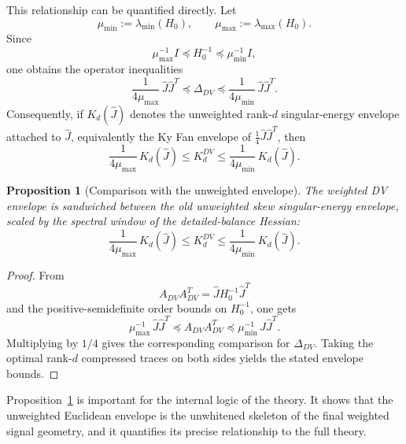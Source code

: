 \documentclass[11pt,a4paper]{article}
\numberwithin{equation}{section}
\theoremstyle{thmcompact}
\newtheorem{proposition}[theorem]{Proposition}
\theoremstyle{remark}
\begin{document}
This relationship can be quantified directly. Let
\begin{equation}
\mu_{\min}:=\lambda_{\min}(H_0),
\qquad
\mu_{\max}:=\lambda_{\max}(H_0).
\end{equation}
Since
\begin{equation}
\mu_{\max}^{-1}I\preceq H_0^{-1}\preceq \mu_{\min}^{-1}I,
\end{equation}
one obtains the operator inequalities
\begin{equation}
\frac{1}{4\mu_{\max}}\,\widehat J\widehat J^T
\preceq
\Delta_{DV}
\preceq
\frac{1}{4\mu_{\min}}\,\widehat J\widehat J^T.
\end{equation}
Consequently, if \(K_d(\widehat J)\) denotes the unweighted rank-\(d\) singular-energy envelope attached to \(\widehat J\), equivalently the Ky Fan envelope of \(\tfrac14\widehat J\widehat J^T\), then
\begin{equation}
\frac{1}{4\mu_{\max}}\,K_d(\widehat J)
\le
K_d^{DV}
\le
\frac{1}{4\mu_{\min}}\,K_d(\widehat J).
\end{equation}

\begin{proposition}[Comparison with the unweighted envelope]
\label{prop:comparison_unweighted_envelope}
The weighted DV envelope is sandwiched between the old unweighted skew singular-energy envelope, scaled by the spectral window of the detailed-balance Hessian:
\begin{equation}
\frac{1}{4\mu_{\max}}\,K_d(\widehat J)
\le
K_d^{DV}
\le
\frac{1}{4\mu_{\min}}\,K_d(\widehat J).
\end{equation}
\end{proposition}

\begin{proof}
From
\begin{equation}
A_{DV}A_{DV}^T=\widehat J H_0^{-1}\widehat J^T
\end{equation}
and the positive-semidefinite order bounds on \(H_0^{-1}\), one gets
\begin{equation}
\mu_{\max}^{-1}\,\widehat J\widehat J^T
\preceq
A_{DV}A_{DV}^T
\preceq
\mu_{\min}^{-1}\,\widehat J\widehat J^T.
\end{equation}
Multiplying by \(1/4\) gives the corresponding comparison for \(\Delta_{DV}\). Taking the optimal rank-\(d\) compressed traces on both sides yields the stated envelope bounds.
\end{proof}

Proposition~\ref{prop:comparison_unweighted_envelope} is important for the internal logic of the theory. It shows that the unweighted Euclidean envelope is the unwhitened skeleton of the final weighted signal geometry, and it quantifies its precise relationship to the full theory.
\end{document}
